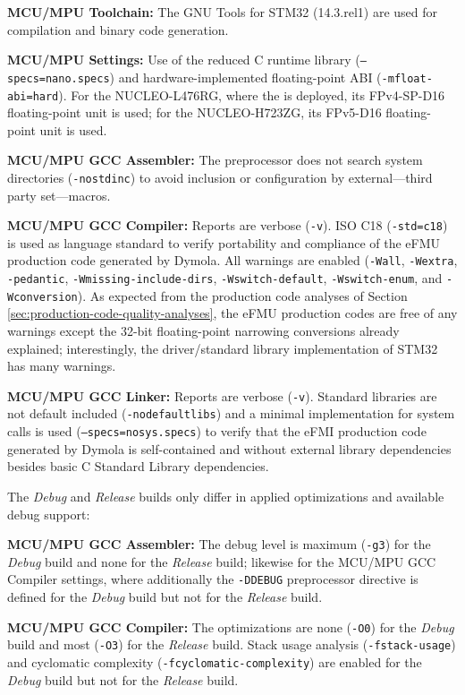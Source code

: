 \squishlist
    \item \textbf{MCU/MPU Toolchain:} The GNU Tools for STM32 (14.3.rel1) are used for compilation and binary code generation.
    \item \textbf{MCU/MPU Settings:} Use of the reduced C runtime library (\texttt{--specs=nano.specs}) and hardware-implemented floating-point ABI (\texttt{-mfloat-abi=hard}). For the NUCLEO-L476RG, where the \controller{} is deployed, its FPv4-SP-D16 floating-point unit is used; for the NUCLEO-H723ZG, its FPv5-D16 floating-point unit is used.
    \item \textbf{MCU/MPU GCC Assembler:} The preprocessor does not search system directories (\texttt{-nostdinc}) to avoid inclusion or configuration by external---third party set---macros.
    \item \textbf{MCU/MPU GCC Compiler:} Reports are verbose (\texttt{-v}). ISO C18 (\texttt{-std=c18}) is used as language standard to verify portability and compliance of the eFMU production code generated by Dymola. All warnings are enabled (\texttt{-Wall}, \texttt{-Wextra}, \texttt{-pedantic}, \texttt{-Wmissing-include-dirs}, \texttt{-Wswitch-default}, \texttt{-Wswitch-enum}, and \texttt{-Wconversion}). As expected from the production code analyses of Section \ref{sec:production-code-quality-analyses}, the eFMU production codes are free of any warnings except the 32-bit floating-point narrowing conversions already explained; interestingly, the driver/standard library implementation of STM32 has many warnings.
    \item \textbf{MCU/MPU GCC Linker:} Reports are verbose (\texttt{-v}). Standard libraries are not default included (\texttt{-nodefaultlibs}) and a minimal implementation for system calls is used (\texttt{--specs=nosys.specs}) to verify that the eFMI production code generated by Dymola is self-contained and without external library dependencies besides basic C Standard Library dependencies.
\squishend

\noindent{}The \textit{Debug} and \textit{Release} builds only differ in applied optimizations and available debug support:

\squishlist
    \item \textbf{MCU/MPU GCC Assembler:} The debug level is maximum (\texttt{-g3}) for the \textit{Debug} build and none for the \textit{Release} build; likewise for the MCU/MPU GCC Compiler settings, where additionally the \texttt{-DDEBUG} preprocessor directive is defined for the \textit{Debug} build but not for the \textit{Release} build.
    \item \textbf{MCU/MPU GCC Compiler:} The optimizations are none (\texttt{-O0}) for the \textit{Debug} build and most (\texttt{-O3}) for the \textit{Release} build. Stack usage analysis (\texttt{-fstack-usage}) and cyclomatic complexity (\texttt{-fcyclomatic-complexity}) are enabled for the \textit{Debug} build but not for the \textit{Release} build.
\squishend

